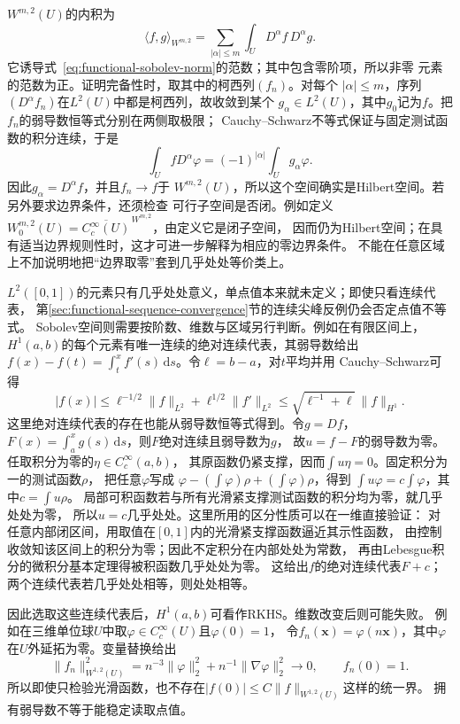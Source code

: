 $W^{m,2}(U)$的内积为
\[
 \langle f,g\rangle_{W^{m,2}}
 =\sum_{|\alpha|\leq m}\int_U D^\alpha f\,D^\alpha g.
\]
它诱导式~\eqref{eq:functional-sobolev-norm}的范数；其中包含零阶项，所以非零
元素的范数为正。证明完备性时，取其中的柯西列$(f_n)$。对每个
$|\alpha|\leq m$，序列$(D^\alpha f_n)$在$L^2(U)$中都是柯西列，故收敛到某个
$g_\alpha\in L^2(U)$，其中$g_0$记为$f$。把$f_n$的弱导数恒等式分别在两侧取极限；
Cauchy--Schwarz不等式保证与固定测试函数的积分连续，于是
\[
  \int_U fD^\alpha\varphi
  =
  (-1)^{|\alpha|}\int_U g_\alpha\varphi.
\]
因此$g_\alpha=D^\alpha f$，并且$f_n\to f$于
$W^{m,2}(U)$，所以这个空间确实是Hilbert空间。若另外要求边界条件，还须检查
可行子空间是否闭。例如定义
$W_0^{m,2}(U)=\overline{C_c^\infty(U)}^{\,W^{m,2}}$，由定义它是闭子空间，
因而仍为Hilbert空间；在具有适当边界规则性时，这才可进一步解释为相应的零边界条件。
不能在任意区域上不加说明地把“边界取零”套到几乎处处等价类上。

$L^2([0,1])$的元素只有几乎处处意义，单点值本来就未定义；即使只看连续代表，
第\ref{sec:functional-sequence-convergence}节的连续尖峰反例仍会否定点值不等式。
Sobolev空间则需要按阶数、维数与区域另行判断。例如在有限区间上，
$H^1(a,b)$的每个元素有唯一连续的绝对连续代表，其弱导数给出
$f(x)-f(t)=\int_t^x f'(s)\,\mathrm ds$。令$\ell=b-a$，对$t$平均并用
Cauchy--Schwarz可得
\[
 |f(x)|\leq \ell^{-1/2}\lVert f\rVert_{L^2}
              +\ell^{1/2}\lVert f'\rVert_{L^2}
 \leq\sqrt{\ell^{-1}+\ell}\,\lVert f\rVert_{H^1}.
\]
这里绝对连续代表的存在也能从弱导数恒等式得到。令$g=Df$，
$F(x)=\int_a^x g(s)\,\mathrm ds$，则$F$绝对连续且弱导数为$g$，
故$u=f-F$的弱导数为零。任取积分为零的$\eta\in C_c^\infty(a,b)$，
其原函数仍紧支撑，因而$\int u\eta=0$。固定积分为一的测试函数$\rho$，
把任意$\varphi$写成
$\varphi-(\int\varphi)\rho+(\int\varphi)\rho$，得到
$\int u\varphi=c\int\varphi$，其中$c=\int u\rho$。
局部可积函数若与所有光滑紧支撑测试函数的积分均为零，就几乎处处为零，
所以$u=c$几乎处处。这里所用的区分性质可以在一维直接验证：
对任意内部闭区间，用取值在$[0,1]$内的光滑紧支撑函数逼近其示性函数，
由控制收敛知该区间上的积分为零；因此不定积分在内部处处为常数，
再由Lebesgue积分的微积分基本定理得被积函数几乎处处为零。
这给出$f$的绝对连续代表$F+c$；
两个连续代表若几乎处处相等，则处处相等。

因此选取这些连续代表后，$H^1(a,b)$可看作RKHS。维数改变后则可能失败。
例如在三维单位球$U$中取$\varphi\in C_c^\infty(U)$且$\varphi(0)=1$，
令$f_n(\bm x)=\varphi(n\bm x)$，其中$\varphi$在$U$外延拓为零。变量替换给出
\[
 \lVert f_n\rVert_{W^{1,2}(U)}^2
 =n^{-3}\lVert\varphi\rVert_2^2+
   n^{-1}\lVert\nabla\varphi\rVert_2^2\longrightarrow0,
 \qquad f_n(0)=1.
\]
所以即使只检验光滑函数，也不存在$|f(0)|\leq C\lVert f\rVert_{W^{1,2}(U)}$这样的统一界。
拥有弱导数不等于能稳定读取点值。



